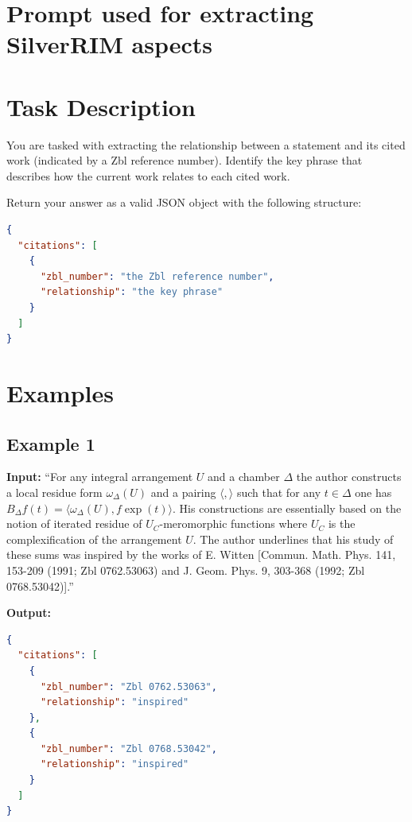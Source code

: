 \documentclass[sigconf,anonymous]{acmart}
\begin{document}
\section{Prompt used for extracting SilverRIM aspects}\label{Appendix:prompt}

\section*{Task Description}
You are tasked with extracting the relationship between a statement and its cited work (indicated by a Zbl reference number). Identify the key phrase that describes how the current work relates to each cited work.

Return your answer as a valid JSON object with the following structure:

\begin{lstlisting}[language=json]
{
  "citations": [
    {
      "zbl_number": "the Zbl reference number",
      "relationship": "the key phrase"
    }
  ]
}
\end{lstlisting}

\section*{Examples}

\subsection*{Example 1}

\textbf{Input:} ``For any integral arrangement $U$ and a chamber $\Delta$ the author constructs a local residue form $\omega_\Delta(U)$ and a pairing $\langle,\rangle$ such that for any $t\in\Delta$ one has $B_\Delta f(t)=\langle\omega_\Delta(U),f\exp(t)\rangle$. His constructions are essentially based on the notion of iterated residue of $U_C$-meromorphic functions where $U_C$ is the complexification of the arrangement $U$. The author underlines that his study of these sums was inspired by the works of E. Witten [Commun. Math. Phys. 141, 153-209 (1991; Zbl 0762.53063) and J. Geom. Phys. 9, 303-368 (1992; Zbl 0768.53042)].''

\textbf{Output:}
\begin{lstlisting}[language=json]
{
  "citations": [
    {
      "zbl_number": "Zbl 0762.53063",
      "relationship": "inspired"
    },
    {
      "zbl_number": "Zbl 0768.53042",
      "relationship": "inspired"
    }
  ]
}
\end{lstlisting}
\end{document}
